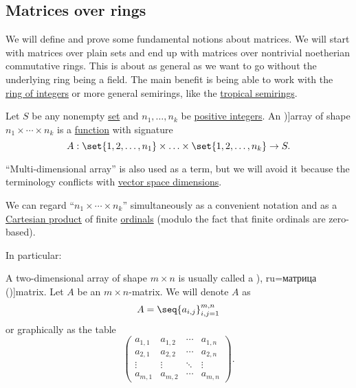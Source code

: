 \subsection{Matrices over rings}\label{subsec:matrices_over_rings}

We will define and prove some fundamental notions about matrices. We will start with matrices over plain sets and end up with matrices over nontrivial noetherian commutative rings. This is about as general as we want to go without the underlying ring being a field. The main benefit is being able to work with the \hyperref[def:integers]{ring of integers} or more general semirings, like the \hyperref[def:tropical_semiring]{tropical semirings}.

\begin{definition}\label{def:array}\mimprovised
  Let \( S \) be any nonempty \hyperref[def:set]{set} and \( n_1, \ldots, n_k \) be \hyperref[def:integer_signum]{positive integers}. An \term[ru=массив (\cite[sec. 40.1]{Тыртышников2007ЛинАлгебра})]{array} of shape \( n_1 \times \cdots \times n_k \) is a \hyperref[def:function]{function} with signature
  \begin{equation*}
    A: \set{ 1, 2, \ldots, n_1 } \times \ldots \times \set{ 1, 2, \ldots, n_k } \to S.
  \end{equation*}

  \enquote{Multi-dimensional array} is also used as a term, but we will avoid it because the terminology conflicts with \hyperref[thm:vector_space_dimension]{vector space dimensions}.

  We can regard \enquote{\( n_1 \times \cdots \times n_k \)} simultaneously as a convenient notation and as a \hyperref[def:cartesian_product]{Cartesian product} of finite \hyperref[def:ordinal]{ordinals} (modulo the fact that finite ordinals are zero-based).

  In particular:
  \begin{thmenum}
     A two-dimensional array of shape \( m \times n \) is usually called a \term[ru=матрица (\cite[\S 1.1.2]{ПетровЗяпков2000ЛААГТом1}), ru=матрица (\cite[sec. 1.1]{Тыртышников2007ЛинАлгебра})]{matrix}. Let \( A \) be an \( m \times n \)-matrix. We will denote \( A \) as
    \begin{equation*}
      A = \seq{ a_{i,j} }_{i,j=1}^{m,n}
    \end{equation*}
    or graphically as the table
    \begin{equation*}
      \begin{pmatrix}
        a_{1,1} & a_{1,2} & \cdots & a_{1,n} \\
        a_{2,1} & a_{2,2} & \cdots & a_{2,n} \\
        \vdots  & \vdots  & \ddots & \vdots  \\
        a_{m,1} & a_{m,2} & \cdots & a_{m,n}
      \end{pmatrix}.
    \end{equation*}


\end{thmenum}
\end{definition}
